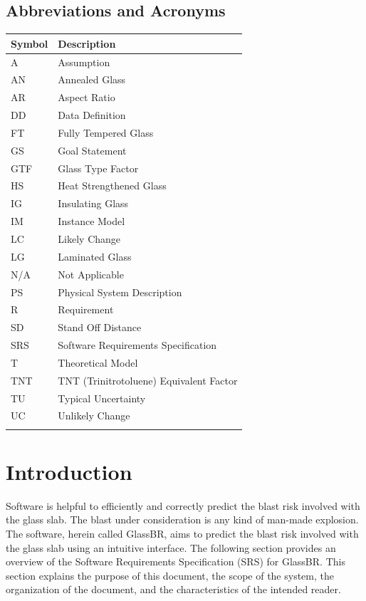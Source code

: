 \documentclass[12pt]{article}
\begin{document}
\subsection{Abbreviations and Acronyms}
\label{Sec:TAbbAcc}
\begin{longtable*}{l l}
\toprule
Symbol & Description
\\
\midrule
A & Assumption
\\
AN & Annealed Glass
\\
AR & Aspect Ratio
\\
DD & Data Definition
\\
FT & Fully Tempered Glass
\\
GS & Goal Statement
\\
GTF & Glass Type Factor
\\
HS & Heat Strengthened Glass
\\
IG & Insulating Glass
\\
IM & Instance Model
\\
LC & Likely Change
\\
LG & Laminated Glass
\\
N/A & Not Applicable
\\
PS & Physical System Description
\\
R & Requirement
\\
SD & Stand Off Distance
\\
SRS & Software Requirements Specification
\\
T & Theoretical Model
\\
TNT & TNT (Trinitrotoluene) Equivalent Factor
\\
TU & Typical Uncertainty
\\
UC & Unlikely Change
\\
\bottomrule
\label{Table:TAbbAcc}
\end{longtable*}
\section{Introduction}
\label{Sec:Intro}
Software is helpful to efficiently and correctly predict the blast risk involved with the glass slab. The blast under consideration is any kind of man-made explosion. The software, herein called GlassBR, aims to predict the blast risk involved with the glass slab using an intuitive interface.
The following section provides an overview of the Software Requirements Specification (SRS) for GlassBR. This section explains the purpose of this document, the scope of the system, the organization of the document, and the characteristics of the intended reader.
\end{document}
